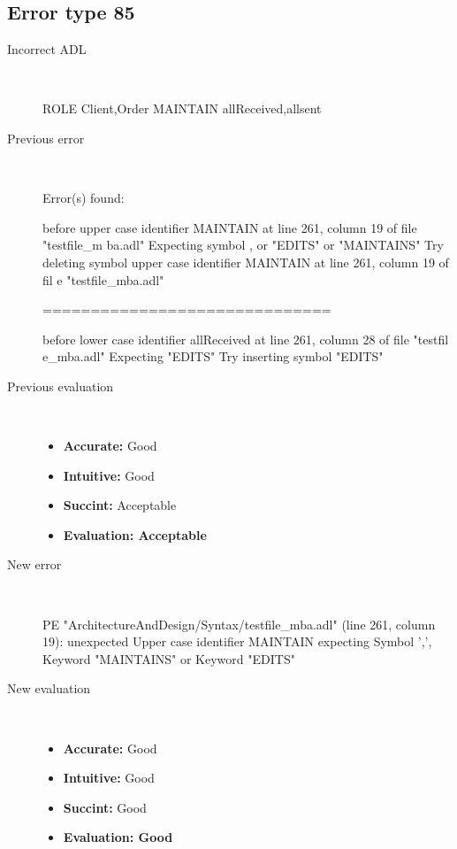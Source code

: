 \hrulefill

\subsection{Error type 85}
  \begin{description}
  \item[Incorrect ADL]~\\
\begin{adl}
ROLE Client,Order MAINTAIN allReceived,allsent\end{adl}
  \item[Previous error]~\\
\begin{haskell}
Error(s) found:

before upper case identifier MAINTAIN at line 261, column 19 of file "testfile_m
ba.adl"
Expecting symbol , or "EDITS" or "MAINTAINS"
Try deleting symbol upper case identifier MAINTAIN at line 261, column 19 of fil
e "testfile_mba.adl"

==============================

before lower case identifier allReceived at line 261, column 28 of file "testfil
e_mba.adl"
Expecting "EDITS"
Try inserting symbol "EDITS"\end{haskell}
  \item[Previous evaluation]~\\
    \begin{itemize}
    \item \textbf{Accurate:} Good
    \item \textbf{Intuitive:} Good
    \item \textbf{Succint:} Acceptable
    \item \textbf{Evaluation: Acceptable}
    \end{itemize}
  \item[New error]~\\
\begin{haskell}
PE "ArchitectureAndDesign/Syntax/testfile_mba.adl" (line 261, column 19):
unexpected Upper case identifier MAINTAIN
expecting Symbol ',', Keyword "MAINTAINS" or Keyword "EDITS"\end{haskell}
  \item[New evaluation]~\\
    \begin{itemize}
    \item \textbf{Accurate:} Good
    \item \textbf{Intuitive:} Good
    \item \textbf{Succint:} Good
    \item \textbf{Evaluation: Good
}
    \end{itemize}
  \end{description}